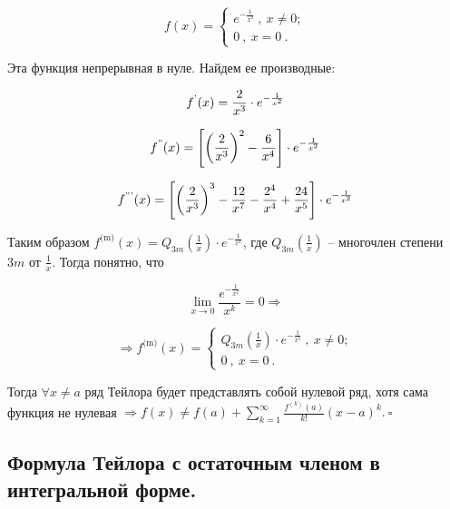 \documentclass[a4paper,12pt]{article} %
\begin{document}
\begin{equation*}
f(x) = \begin{cases}
   e^{-\frac{1}{x^2}}\ ,\ x \neq 0;\\
   0\ ,\ x = 0\ .
 \end{cases}
\end{equation*}

Эта функция непрерывная в нуле. Найдем ее производные:

\begin{equation*}
f^{\text{'}}(x) = \frac{2}{x^3}\cdot e^{-\frac{1}{x^2}}\\
\end{equation*}

\begin{equation*}
f^{\text{''}}(x) = \left[ \left( \frac{2}{x^3}\right)^2 - \frac{6}{x^4} \right]\cdot e^{-\frac{1}{x^2}}\\
\end{equation*}

\begin{equation*}
f^{\text{'''}}(x) = \left[ \left( \frac{2}{x^3}\right)^3 - \frac{12}{x^7} - \frac{2^4}{x^4} + \frac{24}{x^5} \right]\cdot e^{-\frac{1}{x^2}}\\
\end{equation*}

Таким образом $f^{\text{(m)}}(x) = Q_{3m}(\frac{1}{x})\cdot e^{-\frac{1}{x^2}}$, где $Q_{3m}(\frac{1}{x})$ -- многочлен степени $3m$ от $\frac{1}{x}$. Тогда понятно, что 

\begin{equation*}
\lim\limits_{x\to 0} \frac{e^{-\frac{1}{x^2}}}{x^k} = 0 \Rightarrow 
\end{equation*}

\begin{equation*}
\Rightarrow f^{\text{(m)}}(x) = \begin{cases}
   Q_{3m}(\frac{1}{x}) \cdot e^{-\frac{1}{x^2}}\ ,\ x \neq 0;\\
   0\ ,\ x = 0\ .
 	\end{cases}
\end{equation*}

Тогда $\forall x \neq a$ ряд Тейлора будет представлять собой нулевой ряд, хотя сама функция не нулевая $\Rightarrow f(x) \neq f(a) + \sum\limits_{k = 1}^{\infty} \frac{f^{(k)}(a)}{k!}(x-a)^k.\ \square$ 


\subsection{Формула Тейлора с остаточным членом в интегральной форме.}
\end{document}
